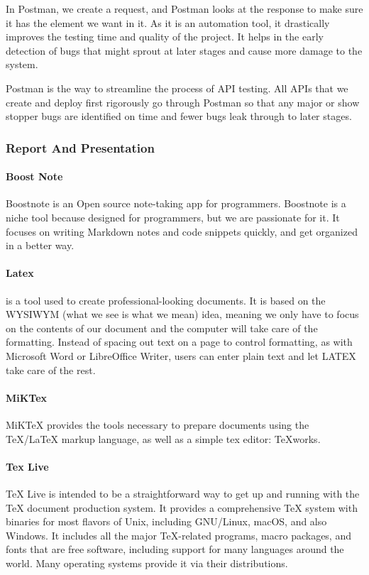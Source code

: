 In Postman, we create a request, and Postman looks at the response to make sure it has the element we want in it. As it is an automation tool, it drastically improves the testing time and quality of the project. It helps in the early detection of bugs that might sprout at later stages and cause more damage to the system.

Postman is the way to streamline the process of API testing. All APIs that we create and deploy first rigorously go through Postman so that any major or show stopper bugs are identified on time and fewer bugs leak through to later stages.




\subsubsection{Report And Presentation}
\paragraph*{Boost Note}
Boostnote is an Open source note-taking app for programmers.
Boostnote is a niche tool because designed for programmers, but we are passionate for it.
It focuses on writing Markdown notes and code snippets quickly, and get organized in a better way.

\paragraph*{Latex}
\latex{} is a tool used to create professional-looking documents. It is based on the WYSIWYM (what we see is what we mean) idea, meaning we only have to focus on the contents of our document and the computer will take care of the formatting. Instead of spacing out text on a page to control formatting, as with Microsoft Word or LibreOffice Writer, users can enter plain text and let LATEX take care of the rest.
\paragraph*{MiKTex}
MiKTeX provides the tools necessary to prepare documents using the TeX/LaTeX markup language, as well as a simple tex editor: TeXworks.

\paragraph*{Tex Live}
TeX Live is intended to be a straightforward way to get up and running with the TeX document production system. It provides a comprehensive TeX system with binaries for most flavors of Unix, including GNU/Linux, macOS, and also Windows. It includes all the major TeX-related programs, macro packages, and fonts that are free software, including support for many languages around the world. Many operating systems provide it via their distributions.



